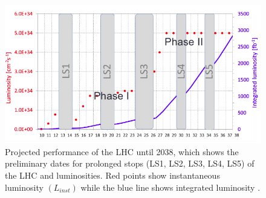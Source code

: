 \begin{figure}[H]
  \centering
  \includegraphics[width=0.7 \columnwidth]{./lumi_projection.png}
  \caption{ \onehalfspacing Projected performance of the LHC until 2038, which shows the preliminary dates for prolonged stops (LS1, LS2, LS3, LS4, LS5) of the LHC and luminosities. Red points show instantaneous luminosity $(L_{inst})$ while the blue line shows integrated luminosity \cite{collaborations2019report}.}
  \label{fig:LHCPlans}
\end{figure}










